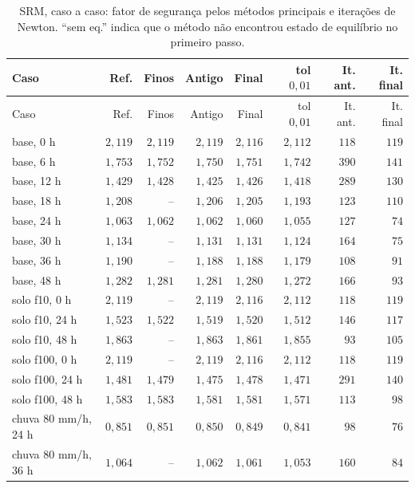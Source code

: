 \documentclass[11pt,a4paper]{article}
\numberwithin{equation}{section}
\begin{document}
{\footnotesize
\begin{longtable}{lrrrrrrr}
\caption{SRM, caso a caso: fator de segurança pelos métodos principais e iterações de Newton. ``sem eq.'' indica que o método não encontrou estado de equilíbrio no primeiro passo.}\label{tab:casos_srm}\\
\toprule
Caso & Ref. & Finos & Antigo & Final & tol $0{,}01$ & It. ant. & It. final \\
\midrule
\endfirsthead
\toprule
Caso & Ref. & Finos & Antigo & Final & tol $0{,}01$ & It. ant. & It. final \\
\midrule
\endhead
\bottomrule
\endfoot
base, 0 h & $2{,}119$ & $2{,}119$ & $2{,}119$ & $2{,}116$ & $2{,}112$ & $118$ & $119$ \\
base, 6 h & $1{,}753$ & $1{,}752$ & $1{,}750$ & $1{,}751$ & $1{,}742$ & $390$ & $141$ \\
base, 12 h & $1{,}429$ & $1{,}428$ & $1{,}425$ & $1{,}426$ & $1{,}418$ & $289$ & $130$ \\
base, 18 h & $1{,}208$ & -- & $1{,}206$ & $1{,}205$ & $1{,}193$ & $123$ & $110$ \\
base, 24 h & $1{,}063$ & $1{,}062$ & $1{,}062$ & $1{,}060$ & $1{,}055$ & $127$ & $74$ \\
base, 30 h & $1{,}134$ & -- & $1{,}131$ & $1{,}131$ & $1{,}124$ & $164$ & $75$ \\
base, 36 h & $1{,}190$ & -- & $1{,}188$ & $1{,}188$ & $1{,}179$ & $108$ & $91$ \\
base, 48 h & $1{,}282$ & $1{,}281$ & $1{,}281$ & $1{,}280$ & $1{,}272$ & $166$ & $93$ \\
solo f10, 0 h & $2{,}119$ & -- & $2{,}119$ & $2{,}116$ & $2{,}112$ & $118$ & $119$ \\
solo f10, 24 h & $1{,}523$ & $1{,}522$ & $1{,}519$ & $1{,}520$ & $1{,}512$ & $146$ & $117$ \\
solo f10, 48 h & $1{,}863$ & -- & $1{,}863$ & $1{,}861$ & $1{,}855$ & $93$ & $105$ \\
solo f100, 0 h & $2{,}119$ & -- & $2{,}119$ & $2{,}116$ & $2{,}112$ & $118$ & $119$ \\
solo f100, 24 h & $1{,}481$ & $1{,}479$ & $1{,}475$ & $1{,}478$ & $1{,}471$ & $291$ & $140$ \\
solo f100, 48 h & $1{,}583$ & $1{,}583$ & $1{,}581$ & $1{,}581$ & $1{,}571$ & $113$ & $98$ \\
chuva 80 mm/h, 24 h & $0{,}851$ & $0{,}851$ & $0{,}850$ & $0{,}849$ & $0{,}841$ & $98$ & $76$ \\
chuva 80 mm/h, 36 h & $1{,}064$ & -- & $1{,}062$ & $1{,}061$ & $1{,}053$ & $160$ & $84$ \\

\end{longtable}}
\end{document}
